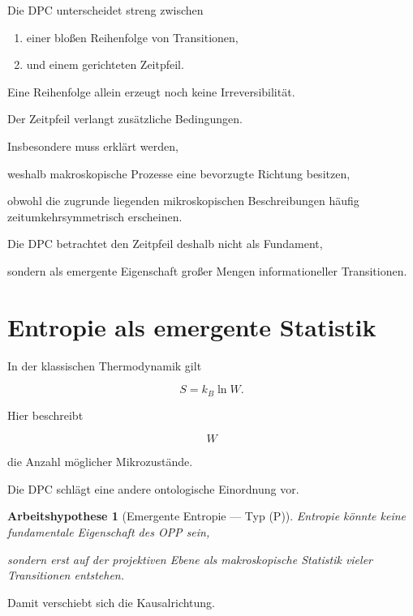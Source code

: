 \documentclass[11pt,a4paper]{article}
\newtheorem{hypothesis}{Arbeitshypothese}
\begin{document}
Die DPC unterscheidet streng zwischen

\begin{enumerate}

\item einer bloßen Reihenfolge von Transitionen,

\item und einem gerichteten Zeitpfeil.

\end{enumerate}

Eine Reihenfolge allein erzeugt noch keine
Irreversibilität.

Der Zeitpfeil verlangt zusätzliche Bedingungen.

Insbesondere muss erklärt werden,

weshalb makroskopische Prozesse eine bevorzugte Richtung
besitzen,

obwohl die zugrunde liegenden mikroskopischen
Beschreibungen häufig zeitumkehrsymmetrisch erscheinen.

Die DPC betrachtet den Zeitpfeil deshalb nicht
als Fundament,

sondern als emergente Eigenschaft großer Mengen
informationeller Transitionen.

\section{Entropie als emergente Statistik}

In der klassischen Thermodynamik gilt

\[
S
=
k_B \ln W.
\]

Hier beschreibt

\[
W
\]

die Anzahl möglicher Mikrozustände.

Die DPC schlägt eine andere ontologische Einordnung vor.

\begin{hypothesis}[Emergente Entropie --- Typ (P)]

Entropie könnte keine fundamentale Eigenschaft des OPP
sein,

sondern erst auf der projektiven Ebene
als makroskopische Statistik vieler Transitionen
entstehen.

\end{hypothesis}

Damit verschiebt sich die Kausalrichtung.
\end{document}

